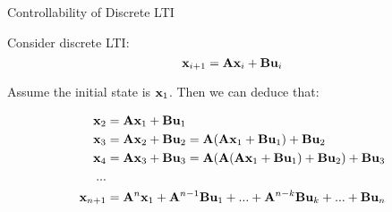 \documentclass{beamer}
\begin{document}
\begin{frame}{Controllability of Discrete LTI}
\begin{flushleft}

Consider discrete LTI:
\begin{equation}
\mathbf{x}_{i+1} = \mathbf{A}  \mathbf{x}_i + \mathbf{B} \mathbf{u}_i
\end{equation}

Assume the initial state is $\mathbf{x}_1$. Then we can deduce that:

\begin{align*}
\mathbf{x}_2 &= \mathbf{A} \mathbf{x}_1 + \mathbf{B} \mathbf{u}_1 \\
\mathbf{x}_3 &= \mathbf{A} \mathbf{x}_2 + \mathbf{B} \mathbf{u}_2 = \mathbf{A} (\mathbf{A} \mathbf{x}_1 + \mathbf{B} \mathbf{u}_1) + \mathbf{B} \mathbf{u}_2 \\
\mathbf{x}_4 &= \mathbf{A} \mathbf{x}_3 + \mathbf{B} \mathbf{u}_3 = \mathbf{A} (\mathbf{A} (\mathbf{A} \mathbf{x}_1 + \mathbf{B} \mathbf{u}_1) + \mathbf{B} \mathbf{u}_2) + \mathbf{B} \mathbf{u}_3 \\
... \\
\mathbf{x}_{n+1} &= \mathbf{A}^n \mathbf{x}_1 + \mathbf{A}^{n-1} \mathbf{B} \mathbf{u}_1 + ... + 
\mathbf{A}^{n - k} \mathbf{B} \mathbf{u}_{k} + ... + 
\mathbf{B} \mathbf{u}_n
\end{align*}

\end{flushleft}
\end{frame}
\end{document}
